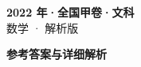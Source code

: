 \documentclass[zihao=-4, a4paper]{ctexart}
\begin{document}
\begin{center}
  {\Large\bfseries 2022 年·全国甲卷·文科}\\[4pt]
  {\large 数学 · 解析版}
\end{center}
\medskip
{}

\clearpage
{}
\begin{center}{\Large\bfseries 参考答案与详细解析}\end{center}
\medskip

\end{document}
